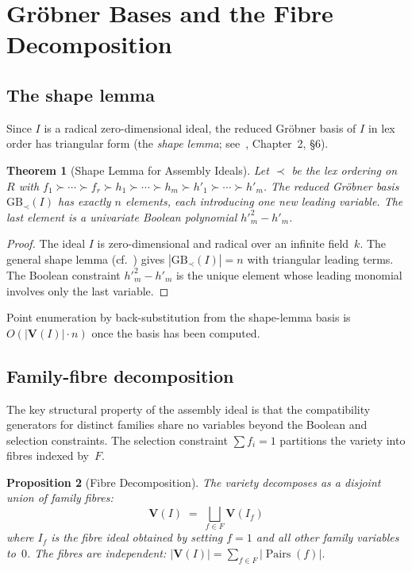 \documentclass[preprint,12pt]{elsarticle}
\newtheorem{theorem}{Theorem}[section]
\newtheorem{proposition}[theorem]{Proposition}
\theoremstyle{definition}
\theoremstyle{remark}
\newcommand{\kk}{k}
\newcommand{\Var}{\mathbf{V}}
\newcommand{\GB}{\mathrm{GB}}
\DeclareMathOperator{\Pairs}{Pairs}
\begin{document}
\section{Gr\"obner Bases and the Fibre Decomposition}\label{sec:groebner}

\subsection{The shape lemma}

Since $I$ is a radical zero-dimensional ideal, the reduced
Gr\"obner basis of $I$ in lex order has triangular form
(the \emph{shape lemma}; see~\cite{CLO15}, Chapter~2, \S6).

\begin{theorem}[Shape Lemma for Assembly Ideals]\label{thm:shape}
Let $\prec$ be the lex ordering on $R$ with
$f_1 \succ \cdots \succ f_r \succ h_1 \succ \cdots \succ h_m
\succ h'_1 \succ \cdots \succ h'_m$.
The reduced Gr\"obner basis $\GB_\prec(I)$ has exactly $n$ elements,
each introducing one new leading variable.  The last element is a
univariate Boolean polynomial $h'^2_m - h'_m$.
\end{theorem}

\begin{proof}
The ideal $I$ is zero-dimensional and radical over an infinite
field~$\kk$.  The general shape lemma (cf.~\cite{CLO15}) gives
$|\GB_\prec(I)| = n$ with triangular leading terms.  The Boolean
constraint $h'^2_m - h'_m$ is the unique element whose leading
monomial involves only the last variable.
\end{proof}

Point enumeration by back-substitution from the shape-lemma basis
is $O(|\Var(I)| \cdot n)$ once the basis has been computed.


\subsection{Family-fibre decomposition}

The key structural property of the assembly ideal is that the
compatibility generators for distinct families share no variables
beyond the Boolean and selection constraints.  The selection
constraint $\sum f_i = 1$ partitions the variety into fibres
indexed by~$F$.

\begin{proposition}[Fibre Decomposition]\label{prop:fibre}
The variety decomposes as a disjoint union of family fibres:
\[
  \Var(I) \;=\; \bigsqcup_{f \in F} \Var(I_f)
\]
where $I_f$ is the fibre ideal obtained by setting $f = 1$ and
all other family variables to~$0$.  The fibres are independent:
$|\Var(I)| = \sum_{f \in F} |\Pairs(f)|$.
\end{proposition}
\end{document}

